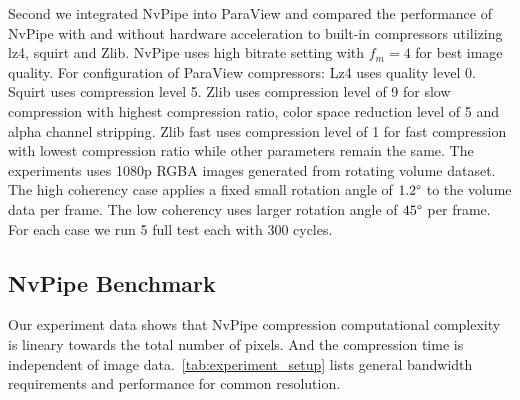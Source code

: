 \documentclass[review]{vgtc}                 %
\begin{document}

Second we integrated NvPipe into ParaView and compared the performance of NvPipe with and without hardware acceleration to built-in compressors utilizing lz4, squirt and Zlib. NvPipe uses high bitrate setting with \(f_m=4\) for best image quality. For configuration of ParaView compressors: Lz4 uses quality level 0. Squirt uses compression level 5. Zlib uses compression level of 9 for slow compression with highest compression ratio, color space reduction level of 5 and alpha channel stripping. Zlib fast uses compression level of 1 for fast compression with lowest compression ratio while other parameters remain the same. The experiments uses 1080p RGBA images generated from rotating volume dataset. The high coherency case applies a fixed small rotation angle of \(1.2\degree\) to the volume data per frame. The low coherency uses larger rotation angle of \(45\degree\) per frame. For each case we run 5 full test each with 300 cycles.

\subsection{NvPipe Benchmark}

Our experiment data shows that NvPipe compression computational complexity is lineary towards the total number of pixels. And the compression time is independent of image data.~\cref{tab:experiment_setup} lists general bandwidth requirements and performance for common resolution. 

%
\end{document}
